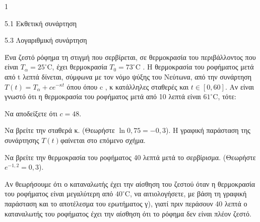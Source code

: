 \begin{ylh}{1}
\item 5.1 Εκθετική συνάρτηση
\item 5.3 Λογαριθμική συνάρτηση
\end{ylh}
Ένα ζεστό ρόφημα τη στιγμή που σερβίρεται, σε θερμοκρασία του περιβάλλοντος που είναι $T_\alpha = 25^\circ\text{C}$, έχει θερμοκρασία $T_0 = 73^\circ\text{C}$ . Η θερμοκρασία του ροφήματος μετά από t λεπτά δίνεται, σύμφωνα με τον νόμο ψύξης του Νεύτωνα, από την συνάρτηση
$T(t) = T_\alpha + c e^{-\kappa t}$
όπου όπου c , κ κατάλληλες σταθερές και $t \in [0, 60]$. Αν είναι γνωστό ότι η θερμοκρασία του ροφήματος μετά από 10 λεπτά είναι $61^\circ\text{C}$, τότε:
\begin{alist}
\item Να αποδείξετε ότι $c = 48$.
\item Να βρείτε την σταθερά κ. (Θεωρήστε $\ln 0,75 = -0,3$).
Η γραφική παράσταση της συνάρτησης $T(t)$φαίνεται στο επόμενο σχήμα.
\begin{center}
\end{center}
\item Να βρείτε την θερμοκρασία του ροφήματος 40 λεπτά μετά το σερβίρισμα. (Θεωρήστε $e^{-1,2} = 0,3$).
\item Αν θεωρήσουμε ότι ο καταναλωτής έχει την αίσθηση του ζεστού όταν η θερμοκρασία του ροφήματος είναι μεγαλύτερη από $40^\circ\text{C}$, να αιτιολογήσετε, με βάση τη γραφική παράσταση και το αποτέλεσμα του ερωτήματος γ), γιατί πριν περάσουν 40 λεπτά ο καταναλωτής του ροφήματος έχει την αίσθηση ότι το ρόφημα δεν είναι πλέον ζεστό.
\end{alist}

